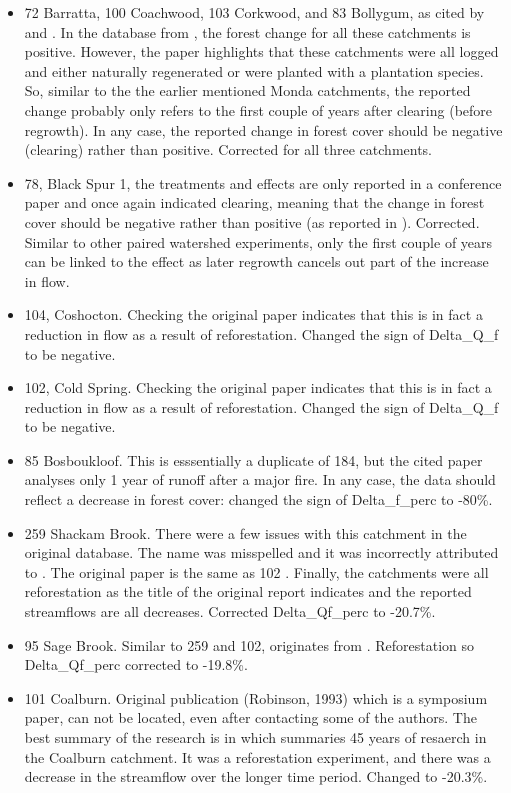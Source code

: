 \documentclass[]{elsarticle} %
\begin{document}
\begin{itemize}
\item
  72 Barratta, 100 Coachwood, 103 Corkwood, and 83 Bollygum, as cited by \citet{cornish1993} and \citet{cornish2001}. In the database from \citet{zhang2017}, the forest change for all these catchments is positive. However, the paper highlights that these catchments were all logged and either naturally regenerated or were planted with a plantation species. So, similar to the the earlier mentioned Monda catchments, the reported change probably only refers to the first couple of years after clearing (before regrowth). In any case, the reported change in forest cover should be negative (clearing) rather than positive. Corrected for all three catchments.
\item
  78, Black Spur 1, the treatments and effects are only reported in a conference paper \citep{jayasuriya1988} and once again indicated clearing, meaning that the change in forest cover should be negative rather than positive (as reported in \citet{zhang2017}). Corrected. Similar to other paired watershed experiments, only the first couple of years can be linked to the effect as later regrowth cancels out part of the increase in flow.
\item
  104, Coshocton. Checking the original paper indicates that this is in fact a reduction in flow as a result of reforestation. Changed the sign of Delta\_Q\_f to be negative.
\item
  102, Cold Spring. Checking the original paper \citep{schneider1961} indicates that this is in fact a reduction in flow as a result of reforestation. Changed the sign of Delta\_Q\_f to be negative.
\item
  85 Bosboukloof. This is esssentially a duplicate of 184, but the cited paper analyses only 1 year of runoff after a major fire. In any case, the data should reflect a decrease in forest cover: changed the sign of Delta\_f\_perc to -80\%.
\item
  259 Shackam Brook. There were a few issues with this catchment in the original database. The name was misspelled and it was incorrectly attributed to \citet{brown2005}. The original paper is the same as 102 \citep{schneider1961}. Finally, the catchments were all reforestation as the title of the original report indicates and the reported streamflows are all decreases. Corrected Delta\_Qf\_perc to -20.7\%.
\item
  95 Sage Brook. Similar to 259 and 102, originates from \citet{schneider1961}. Reforestation so Delta\_Qf\_perc corrected to -19.8\%.
\item
  101 Coalburn. Original publication (Robinson, 1993) which is a symposium paper, can not be located, even after contacting some of the authors. The best summary of the research is in \citet{birkinshaw2014} which summaries 45 years of resaerch in the Coalburn catchment. It was a reforestation experiment, and there was a decrease in the streamflow over the longer time period. Changed to -20.3\%.
\end{itemize}
\end{document}
